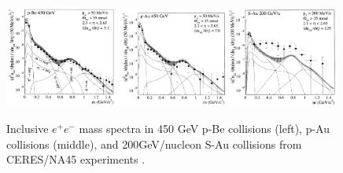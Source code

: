 \begin{figure}
\begin{centering}
\includegraphics[width=0.33\textwidth]{fig/1.Introduction/N45_pBe}\includegraphics[width=0.33\textwidth]{fig/1.Introduction/NA45_pAu}\includegraphics[width=0.33\textwidth]{fig/1.Introduction/NA45_sAu}
\par\end{centering}

\protect\caption{Inclusive $e^{+}e^{-}$ mass spectra in 450 GeV p-Be collisions (left),
p-Au collisions (middle), and 200GeV/nucleon S-Au collisions from
CERES/NA45 experiments \cite{PhysRevLett.75.1272}.}


\label{fig:NA45}
\end{figure}


